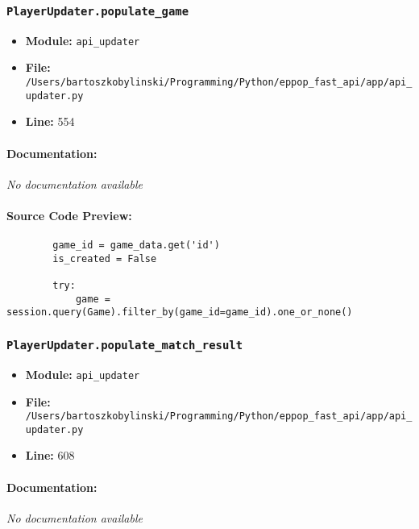 \documentclass[11pt,a4paper]{article}
\begin{document}
\vspace{1em}
\subsubsection{\texttt{PlayerUpdater.populate\_game}}

\begin{itemize}
    \item \textbf{Module:} \texttt{api\_updater}
    \item \textbf{File:} \texttt{/Users/bartoszkobylinski/Programming/Python/eppop\_fast\_api/app/api\_updater.py}
    \item \textbf{Line:} 554
\end{itemize}

\paragraph{Documentation:} \textit{No documentation available}

\paragraph{Source Code Preview:}
\begin{verbatim}
        game_id = game_data.get('id')
        is_created = False

        try:
            game = session.query(Game).filter_by(game_id=game_id).one_or_none()
\end{verbatim}

\vspace{1em}
\subsubsection{\texttt{PlayerUpdater.populate\_match\_result}}

\begin{itemize}
    \item \textbf{Module:} \texttt{api\_updater}
    \item \textbf{File:} \texttt{/Users/bartoszkobylinski/Programming/Python/eppop\_fast\_api/app/api\_updater.py}
    \item \textbf{Line:} 608
\end{itemize}

\paragraph{Documentation:} \textit{No documentation available}
\end{document}

